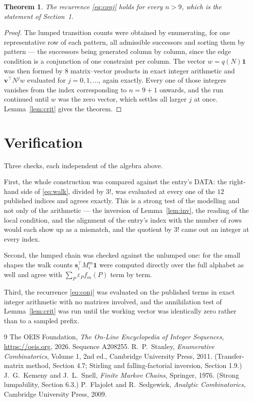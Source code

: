 \documentclass[11pt,a4paper]{article}
\theoremstyle{plain}
\newtheorem{theorem}{Theorem}
\theoremstyle{definition}
\begin{document}
\begin{theorem}
The recurrence \eqref{eq:conj} holds for every $n>9$, which is the statement of
Section~1.
\end{theorem}

\begin{proof}
The lumped transition counts were obtained by enumerating, for one representative row of
each pattern, all admissible successors and sorting them by pattern --- the successors being
generated column by column, since the edge condition is a conjunction of one constraint per
column. The vector $w=q(N)\mathbf{1}$ was then formed by $8$ matrix--vector products
in exact integer arithmetic and $\mathbf{v}^{\!\top}N^{j}w$ evaluated for
$j=0,1,\dots$, again exactly. Every one of those integers vanishes from the index
corresponding to $n=9+1$ onwards, and the run continued until $w$ was the zero vector,
which settles all larger $j$ at once. Lemma~\ref{lem:crit} gives the theorem.
\end{proof}

\section{Verification}

Three checks, each independent of the algebra above.

First, the whole construction was compared against the entry's DATA: the right-hand side of
\eqref{eq:walk}, divided by $3!$, was evaluated at every one of the $12$
published indices and agrees exactly. This is a strong test of the modelling and not only of
the arithmetic --- the inversion of Lemma~\ref{lem:inv}, the reading of the local
condition, and the alignment of the entry's index with the number of rows would each
show up as a mismatch, and the quotient by $3!$ came out an integer at every index.

Second, the lumped chain was checked against the unlumped one: for the small shapes the walk
counts $\mathbf{s}_i^{\!\top}M_i^{m}\mathbf{1}$ were computed directly over the full
alphabet as well and agree with $\sum_P\varepsilon_Pf_m(P)$ term by term.

Third, the recurrence \eqref{eq:conj} was evaluated on the published terms in exact integer
arithmetic with no matrices involved, and the annihilation test of Lemma~\ref{lem:crit} was
run until the working vector was identically zero rather than to a sampled prefix.

\begin{thebibliography}{9}
 The OEIS Foundation, \emph{The On-Line Encyclopedia of Integer
Sequences}, \url{https://oeis.org}, 2026. Sequence A208255.
 R.~P.~Stanley, \emph{Enumerative Combinatorics}, Volume 1, 2nd ed.,
Cambridge University Press, 2011. (Transfer-matrix method, Section 4.7; Stirling and
falling-factorial inversion, Section 1.9.)
 J.~G.~Kemeny and J.~L.~Snell, \emph{Finite Markov Chains}, Springer,
1976. (Strong lumpability, Section 6.3.)
 P.~Flajolet and R.~Sedgewick, \emph{Analytic Combinatorics}, Cambridge
University Press, 2009.
\end{thebibliography}
\end{document}
